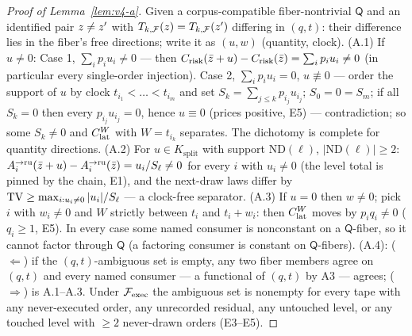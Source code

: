 \begin{proof}[Proof of Lemma~\ref{lem:v4-a}]
Given a corpus-compatible fiber-nontrivial $\mathsf{Q}$ and an identified pair
$\rawflow \ne \rawflow'$ with $\recordedmap(\rawflow) =
\recordedmap(\rawflow')$ differing in $(q,t)$: their difference lies in the
fiber's free directions; write it as $(u, w)$ (quantity, clock).
(A.1) If $u \ne 0$: Case 1, $\sum_i p_iu_i \ne 0$ --- then
$\Crisk(\bar{\rawflow} + u) - \Crisk(\bar{\rawflow}) = \sum_ip_iu_i \ne 0$
(in particular every single-order injection). Case 2,
$\sum_ip_iu_i = 0$, $u \not\equiv 0$ --- order the support of $u$ by clock
$t_{i_1} < \dots < t_{i_m}$ and set $S_k = \sum_{j \le k}p_{i_j}u_{i_j}$;
$S_0 = 0 = S_m$; if all $S_k = 0$ then every $p_{i_j}u_{i_j} = 0$, hence
$u \equiv 0$ (prices positive, E5) --- contradiction; so some $S_k \ne 0$
and $\Clat[W]$ with $W = t_{i_k}$ separates. The dichotomy is complete for
quantity directions. (A.2) For $u \in K_{\mathrm{split}}$ with support
$\mathrm{ND}(\ell)$, $|\mathrm{ND}(\ell)| \ge 2$:
$A^{\to\ru}_i(\bar{\rawflow} + u) - A^{\to\ru}_i(\bar{\rawflow}) =
u_i/S_\ell \ne 0$ for every $i$ with $u_i \ne 0$ (the level total is pinned
by the  chain, E1), and the next-draw laws differ by
$\TV \ge \max_{i : u_i \ne 0}|u_i|/S_\ell$ --- a clock-free separator.
(A.3) If $u = 0$ then $w \ne 0$; pick $i$ with $w_i \ne 0$ and $W$ strictly
between $t_i$ and $t_i + w_i$: then
$\Clat[W]$ moves by $p_iq_i \ne 0$ ($q_i \ge 1$, E5). In every case some
named consumer is nonconstant on a $\mathsf{Q}$-fiber, so it cannot factor
through $\mathsf{Q}$ (a factoring consumer is constant on
$\mathsf{Q}$-fibers). (A.4): ($\Leftarrow$)
if the $(q,t)$-ambiguous set is empty, any two fiber members agree on
$(q,t)$ and every named consumer --- a functional of $(q,t)$ by A3 ---
agrees; ($\Rightarrow$) is A.1--A.3. Under $\Fexec$ the ambiguous set is
nonempty for every tape with any never-executed order, any unrecorded
residual, any untouched level, or any touched level with $\ge 2$ never-drawn
orders (E3--E5).
\end{proof}

